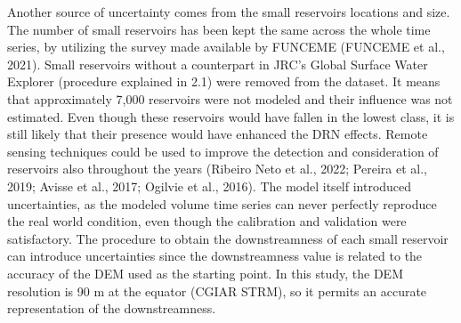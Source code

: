 \documentclass[draft]{agujournal2019}
\begin{document}
Another source of uncertainty comes from the small reservoirs locations and size. The number of small reservoirs has been kept the same across the whole time series, by utilizing the survey made available by FUNCEME (FUNCEME et al., 2021). Small reservoirs without a counterpart in JRC’s Global Surface Water Explorer (procedure explained in 2.1) were removed from the dataset. It means that approximately 7,000 reservoirs were not modeled and their influence was not estimated. Even though these reservoirs would have fallen in the lowest class, it is still likely that their presence would have enhanced the DRN effects. Remote sensing techniques could be used to improve the detection and consideration of reservoirs also throughout the years (Ribeiro Neto et al., 2022; Pereira et al., 2019; Avisse et al., 2017; Ogilvie et al., 2016). The model itself introduced uncertainties, as the modeled volume time series can never perfectly reproduce the real world condition, even though the calibration and validation were satisfactory. The procedure to obtain the downstreamness of each small reservoir can introduce uncertainties since the downstreamness value is related to the accuracy of the DEM used as the starting point. In this study, the DEM resolution is 90 m at the equator (CGIAR STRM), so it permits an accurate representation of the downstreamness.
\end{document}
